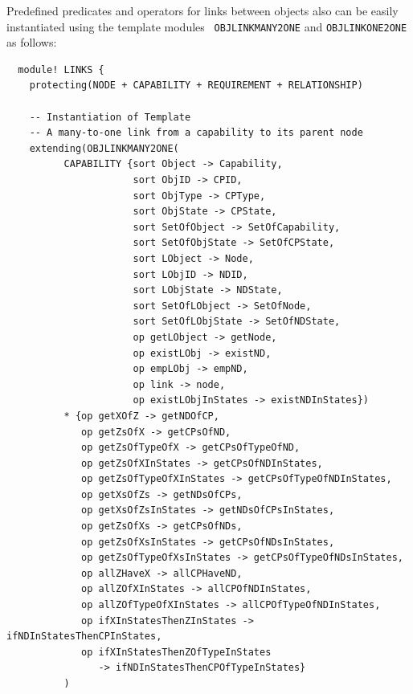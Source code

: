 \documentclass[12pt]{report}
\begin{document}
Predefined predicates and operators for links between objects also can
be easily instantiated using the template modules {\tt
  OBJLINKMANY2ONE} and {\tt OBJLINKONE2ONE} as follows:
\small
\begin{verbatim}
  module! LINKS {
    protecting(NODE + CAPABILITY + REQUIREMENT + RELATIONSHIP)
  
    -- Instantiation of Template
    -- A many-to-one link from a capability to its parent node
    extending(OBJLINKMANY2ONE(
          CAPABILITY {sort Object -> Capability,
                      sort ObjID -> CPID,
                      sort ObjType -> CPType,
                      sort ObjState -> CPState,
                      sort SetOfObject -> SetOfCapability,
                      sort SetOfObjState -> SetOfCPState,
                      sort LObject -> Node,
                      sort LObjID -> NDID,
                      sort LObjState -> NDState,
                      sort SetOfLObject -> SetOfNode,
                      sort SetOfLObjState -> SetOfNDState,
                      op getLObject -> getNode,
                      op existLObj -> existND,
                      op empLObj -> empND,
                      op link -> node,
                      op existLObjInStates -> existNDInStates})
          * {op getXOfZ -> getNDOfCP,
             op getZsOfX -> getCPsOfND,
             op getZsOfTypeOfX -> getCPsOfTypeOfND,
             op getZsOfXInStates -> getCPsOfNDInStates,
             op getZsOfTypeOfXInStates -> getCPsOfTypeOfNDInStates,
             op getXsOfZs -> getNDsOfCPs,
             op getXsOfZsInStates -> getNDsOfCPsInStates,
             op getZsOfXs -> getCPsOfNDs,
             op getZsOfXsInStates -> getCPsOfNDsInStates,
             op getZsOfTypeOfXsInStates -> getCPsOfTypeOfNDsInStates,
             op allZHaveX -> allCPHaveND,
             op allZOfXInStates -> allCPOfNDInStates,
             op allZOfTypeOfXInStates -> allCPOfTypeOfNDInStates,
             op ifXInStatesThenZInStates -> ifNDInStatesThenCPInStates,
             op ifXInStatesThenZOfTypeInStates
                -> ifNDInStatesThenCPOfTypeInStates}
          )
  

\end{verbatim}
\end{document}

